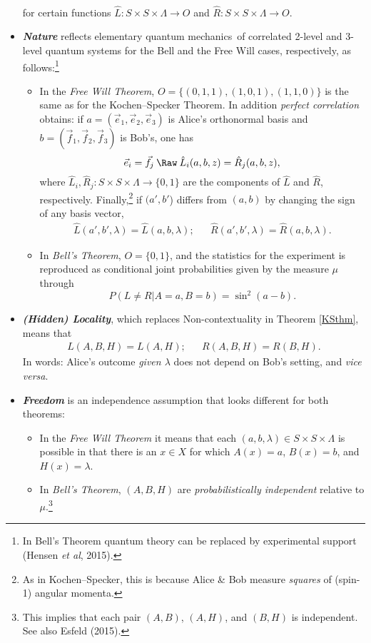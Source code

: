 \documentclass[12pt]{article}
\numberwithin{equation}{section}
\newcommand{\hi}[1]{\emph{\textbf{#1}}}
\newcommand{\qm}{quantum mechanics}
\newcommand{\raw}{\rightarrow}
\newcommand{\x}{\times}
\newcommand{\lm}{\lambda} \newcommand{\Lm}{\Lambda}
\begin{document}
\begin{itemize}
\begin{align}
\end{align}
  for certain functions
  $\hat{L}:S \x S\x \Lm\raw O$ and  $\hat{R}:S \x S\x \Lm\raw O$. 
  \item \hi{Nature}  reflects elementary \qm\ of correlated 2-level and 3-level quantum systems for the Bell and the Free Will cases, respectively, as follows:\footnote{In Bell's Theorem quantum theory can be replaced by experimental support (Hensen  \emph{et al}, 2015). }
   \begin{itemize}
\item  In the \emph{Free Will Theorem},  $O=\{(0,1,1), (1,0,1), (1,1,0)\}$ is the same as for the Kochen--Specker Theorem. In addition  \emph{perfect correlation} obtains: if $a=(\vec{e}_1,\vec{e}_2,\vec{e}_3)$ is Alice's orthonormal basis
and  $b=(\vec{f}_1,\vec{f}_2,\vec{f}_3)$ is Bob's, one has
 \begin{equation}
\vec{e}_i=\vec{f}_j\: \Raw\: \hat{L}_i(a,b,z)=\hat{R}_j(a,b,z), \label{ienj}
\end{equation}
where $\hat{L}_i, \hat{R}_j: S \x S\x \Lm\raw \{0,1\}$ are the components of $\hat{L}$ and $\hat{R}$, respectively.  Finally,\footnote{As in Kochen--Specker, this is because Alice \& Bob measure \emph{squares} of (spin-1) angular momenta.} if $(a',b'$) differs from $(a,b)$ by changing the sign of any  basis vector,
 \begin{align}
\hat{L}(a',b',\lm)=\hat{L}(a,b,\lm); && 
\hat{R}(a',b',\lm)=\hat{R}(a,b,\lm).
\end{align}
\item In \emph{Bell's Theorem}, $O=\{0,1\}$, and the statistics for the experiment is reproduced as conditional joint probabilities given by the measure $\mu$ through
\begin{equation}
P(L\neq R|A=a,B=b)=\sin^2(a-b).\label{uitkomstAspect2} 
\end{equation}
\end{itemize}
\item \hi{(Hidden)  Locality}, which replaces Non-contextuality in Theorem \ref{KSthm}, means that 
\begin{align}
L(A,B,H)=L(A,H); && R(A,B,H)=R(B,H).
\end{align} In words: Alice's outcome \emph{given $\lm$} does not depend on Bob's setting, and \emph{vice versa}. 
\item  \hi{Freedom} is an independence assumption that looks different for both theorems:
\begin{itemize}
\item In the \emph{Free Will Theorem} it means  that  each $(a,b,\lm)\in S\x S\x \Lm$ is possible in that there is an $x\in X$  for which $A(x)=a$, $B(x)=b$, and $H(x)=\lm$.
\item In  \emph{Bell's Theorem},  $(A,B,H)$ are \emph{probabilistically independent} relative to $\mu$.\footnote{This implies  that each pair $(A,B)$, $(A,H)$, and $(B,H)$ is independent. See also Esfeld (2015).}
\end{itemize}
  \end{itemize}
\end{document}
